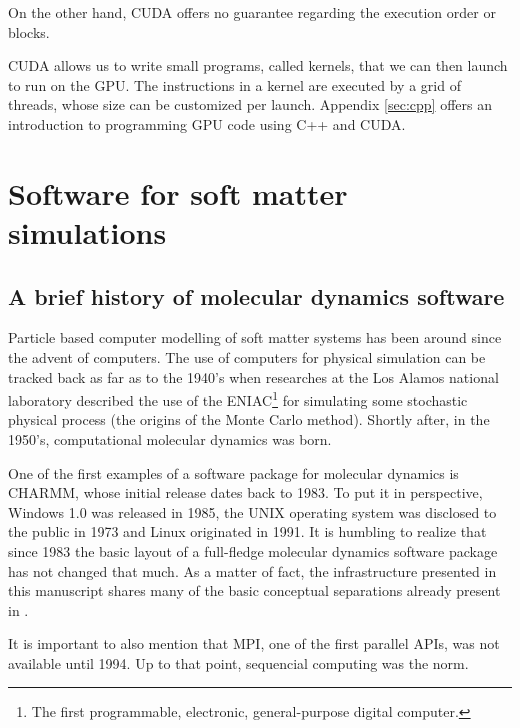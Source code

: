 \documentclass[ twoside,openright,titlepage,numbers=noenddot,%
headinclude,footinclude,cleardoublepage=empty,abstract=on,
BCOR=5mm,paper=a4,fontsize=11pt, dvipsnames
]{scrreprt}
\newcommand{\gpu}{\gls{GPU}\xspace}
\begin{document}
On the other hand, CUDA offers no guarantee regarding the execution order or blocks.

CUDA allows us to write small programs, called kernels, that we can then launch to run on the \gpu. The instructions in a kernel are executed by a grid of threads, whose size can be customized per launch. Appendix \ref{sec:cpp} offers an introduction to programming \gpu code using C++ and CUDA.


\section{Software for soft matter simulations}

\subsection*{A brief history of molecular dynamics software}
Particle based computer modelling of soft matter systems has been around since the advent of computers. The use of computers for physical simulation can be tracked back as far as to the 1940's when researches at the Los Alamos national laboratory described the use of the ENIAC\footnote{The first programmable, electronic, general-purpose digital computer.} for simulating some stochastic physical process\cite{Hurd1985} (the origins of the Monte Carlo method\cite{Johansen2010}). Shortly after, in the 1950's, computational molecular dynamics was born\cite{DeTullio2016}.

One of the first examples of a software package for molecular dynamics is CHARMM, whose initial release dates back to 1983\cite{Brooks1983}. To put it in perspective, Windows 1.0 was released in 1985, the UNIX operating system was disclosed to the public in 1973 and Linux originated in 1991. It is humbling to realize that since 1983 the basic layout of a full-fledge molecular dynamics software package has not changed that much. As a matter of fact, the infrastructure presented in this manuscript shares many of the basic conceptual separations already present in \cite{Brooks1983}.

It is important to also mention that MPI, one of the first parallel \glspl{API}, was not available until 1994. Up to that point, sequencial computing was the norm.
\end{document}
